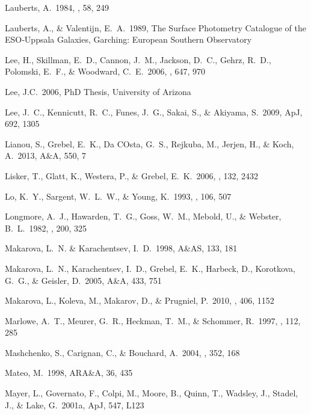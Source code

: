 \documentclass[12pt,onecolumn]{emulateapj}
\begin{document}
\begin{thebibliography}{}
Lauberts, A.\ 1984, \aaps, 58, 249 

Lauberts, A., \& Valentijn, E.~A.\ 1989,
The Surface Photometry Catalogue of the ESO‐Uppsala Galaxies,
Garching: European Southern Observatory  

Lee, H., Skillman, E.~D., Cannon, J.~M., Jackson, D.~C., Gehrz, R.~D., 
Polomski, E.~F., \& Woodward, C.~E.\ 2006, \apj, 647, 970 

Lee, J.C.\ 2006, PhD Thesis, University of Arizona

Lee, J.~C., Kennicutt, R.~C., Funes, J.~G., Sakai, S., \& Akiyama, S.\ 2009, ApJ, 692, 1305

Lianou, S., Grebel, E.~K., Da COsta, G.~S., Rejkuba, M., Jerjen, H., \& Koch, A.\ 2013, A\&A, 550, 7

Lisker, T., Glatt, K., Westera, P., \& Grebel, E.~K.\ 2006, \aj, 132, 2432

Lo, K.~Y., Sargent, W.~L.~W., \& Young, K.\ 1993, \aj, 106, 507 

Longmore, A.~J., Hawarden, T.~G., Goss, W.~M., Mebold, U., \& Webster, B.~L.\ 1982, \mnras, 200, 325

Makarova, L.~N. \& Karachentsev, I.~D.\ 1998, A\&AS, 133, 181

Makarova, L.~N., Karachentsev, I.~D., Grebel, E.~K., Harbeck, D., Korotkova, G.~G., \&
Geisler, D.\ 2005, A\&A, 433, 751

Makarova, L., Koleva, M., Makarov, D., \& Prugniel, P.\ 2010, \mnras, 406, 1152 

Marlowe, A.~T., Meurer, G.~R., Heckman, T.~M., \& Schommer, R.\ 1997, \apjs , 112, 285

Mashchenko, S., Carignan, C., \& Bouchard, A.\ 2004, \mnras, 352, 168 

Mateo, M.\ 1998, ARA\&A, 36, 435

Mayer, L., Governato, F., Colpi, M., Moore, B., Quinn, T., Wadsley, J., 
Stadel, J., \& Lake, G.\ 2001a, ApJ, 547, L123


\end{thebibliography}
\end{document}
